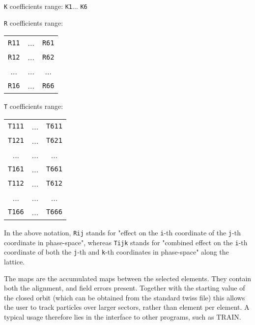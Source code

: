 

{\tt K} coefficients range: 
{\tt K1}... 
{\tt K6}


{\tt R} coefficients range: 
\begin{tabular}{ccc}
{\tt R11} & ... & {\tt R61} \\ 
{\tt R12} & ... & {\tt R62} \\ 
... & ... & ... \\ 
{\tt R16} & ... & {\tt R66}
\end{tabular}


{\tt T} coefficients range: 
\begin{tabular}{ccc}
{\tt T111} & ... &{\tt T611} \\ 
{\tt T121} & ... & {\tt T621} \\ 
... & ... & ... \\ 
{\tt T161} & ... & {\tt T661} \\ 
{\tt T112} & ... & {\tt T612} \\ 
... & ... & ... \\ 
{\tt T166} & ... & {\tt T666}
\end{tabular}

 In the above notation, 
{\tt Rij} stands for "effect on the 
{\tt i}-th coordinate of the 
{\tt j}-th coordinate in phase-space", whereas 
{\tt Tijk} stands for "combined effect on the 
{\tt i}-th coordinate of both the 
{\tt j}-th and 
{\tt k}-th coordinates in phase-space" along the lattice. 

% 
% 
% 
% 
% 
% 
% 
   
The maps are the accumulated maps between the selected elements. They
contain both the alignment, and field errors present. Together with the
starting value of the closed orbit (which can be obtained from the
standard twiss file) this allows the user to track particles over larger
sectors, rather than element per element. A typical usage therefore lies
in the interface to other programs, such as TRAIN.  


